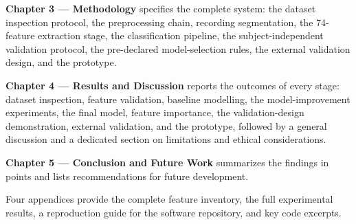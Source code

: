 \textbf{Chapter 3 --- Methodology} specifies the complete system: the
dataset inspection protocol, the preprocessing chain, recording
segmentation, the 74-feature extraction stage, the classification
pipeline, the subject-independent validation protocol, the pre-declared
model-selection rules, the external validation design, and the
prototype.

\textbf{Chapter 4 --- Results and Discussion} reports the outcomes of
every stage: dataset inspection, feature validation, baseline
modelling, the model-improvement experiments, the final model, feature
importance, the validation-design demonstration, external validation,
and the prototype, followed by a general discussion and a dedicated
section on limitations and ethical considerations.

\textbf{Chapter 5 --- Conclusion and Future Work} summarizes the
findings in points and lists recommendations for future development.

Four appendices provide the complete feature inventory, the full
experimental results, a reproduction guide for the software repository,
and key code excerpts.
